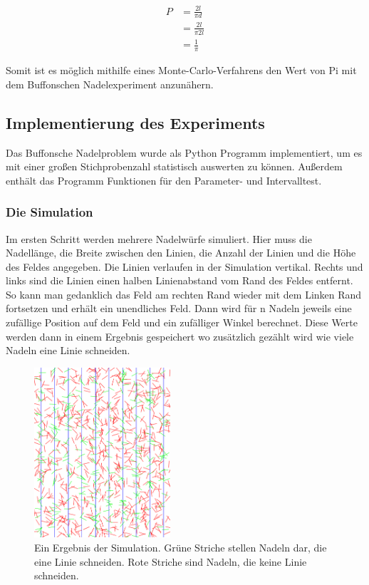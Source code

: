 \documentclass[10pt,twocolumn]{scrartcl}
\begin{document}
		\begin{align}
			P &= \frac{2l}{\pi d}\\ \nonumber
			&= \frac{2l}{\pi 2l}\\ \nonumber
			&= \frac{1}{\pi} \nonumber
		\end{align}
		
		Somit ist es möglich mithilfe eines Monte-Carlo-Verfahrens den Wert von Pi mit dem Buffonschen Nadelexperiment anzunähern.

	\subsection{Implementierung des Experiments}
		Das Buffonsche Nadelproblem wurde als Python\cite{Python} Programm implementiert, um es mit einer großen Stichprobenzahl statistisch auswerten zu können. Außerdem enthält das Programm Funktionen für den Parameter- und Intervalltest.

		\subsubsection*{Die Simulation}
			Im ersten Schritt werden mehrere Nadelwürfe simuliert. Hier muss die Nadellänge, die Breite zwischen den Linien, die Anzahl der Linien und die Höhe des Feldes angegeben. Die Linien verlaufen in der Simulation vertikal. Rechts und links sind die Linien einen halben Linienabstand vom Rand des Feldes entfernt. So kann man gedanklich das Feld am rechten Rand wieder mit dem Linken Rand fortsetzen und erhält ein unendliches Feld. Dann wird für n Nadeln jeweils eine zufällige Position auf dem Feld und ein zufälliger Winkel berechnet. Diese Werte werden dann in einem Ergebnis gespeichert wo zusätzlich gezählt wird wie viele Nadeln eine Linie schneiden.

			\begin{figure}[htb]
				\centering
				\includegraphics[width=0.45\textwidth]{images/needels.png}
				\caption{Ein Ergebnis der Simulation. Grüne Striche stellen Nadeln dar, die eine Linie schneiden. Rote Striche sind Nadeln, die keine Linie schneiden.}
				\label{fig:needels}
			\end{figure}
\end{document}
